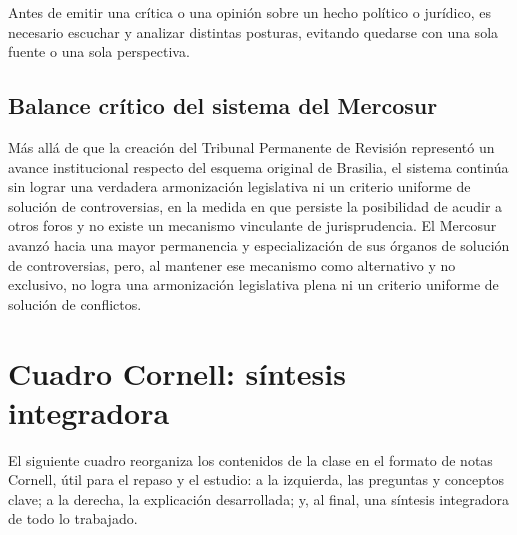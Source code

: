 \documentclass[12pt,oneside]{book}
\begin{document}
\begin{important}
Antes de emitir una crítica o una opinión sobre un hecho político o jurídico, es necesario escuchar y analizar distintas posturas, evitando quedarse con una sola fuente o una sola perspectiva.
\end{important}

\section{Balance crítico del sistema del Mercosur}

Más allá de que la creación del Tribunal Permanente de Revisión representó un avance institucional respecto del esquema original de Brasilia, el sistema continúa sin lograr una verdadera armonización legislativa ni un criterio uniforme de solución de controversias, en la medida en que persiste la posibilidad de acudir a otros foros y no existe un mecanismo vinculante de jurisprudencia. El Mercosur avanzó hacia una mayor permanencia y especialización de sus órganos de solución de controversias, pero, al mantener ese mecanismo como alternativo y no exclusivo, no logra una armonización legislativa plena ni un criterio uniforme de solución de conflictos.

\chapter{Cuadro Cornell: síntesis integradora}

El siguiente cuadro reorganiza los contenidos de la clase en el formato de notas Cornell, útil para el repaso y el estudio: a la izquierda, las preguntas y conceptos clave; a la derecha, la explicación desarrollada; y, al final, una síntesis integradora de todo lo trabajado.
\end{document}
